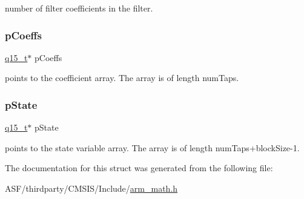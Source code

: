 number of filter coefficients in the filter. \mbox{\label{structarm__fir__instance__q15_a7ca181a37f714d174445f486bebce26f}} 
\subsubsection{\texorpdfstring{pCoeffs}{pCoeffs}}
{\footnotesize\ttfamily \mbox{\hyperlink{arm__math_8h_ab5a8fb21a5b3b983d5f54f31614052ea}{q15\+\_\+t}}$\ast$ p\+Coeffs}

points to the coefficient array. The array is of length num\+Taps. \mbox{\label{structarm__fir__instance__q15_ae29dfdb736374fcddaeaec4b7770170c}} 
\subsubsection{\texorpdfstring{pState}{pState}}
{\footnotesize\ttfamily \mbox{\hyperlink{arm__math_8h_ab5a8fb21a5b3b983d5f54f31614052ea}{q15\+\_\+t}}$\ast$ p\+State}

points to the state variable array. The array is of length num\+Taps+block\+Size-\/1. 

The documentation for this struct was generated from the following file\+:\begin{DoxyCompactItemize}
\item 
A\+S\+F/thirdparty/\+C\+M\+S\+I\+S/\+Include/\mbox{\hyperlink{arm__math_8h}{arm\+\_\+math.\+h}}\end{DoxyCompactItemize}
